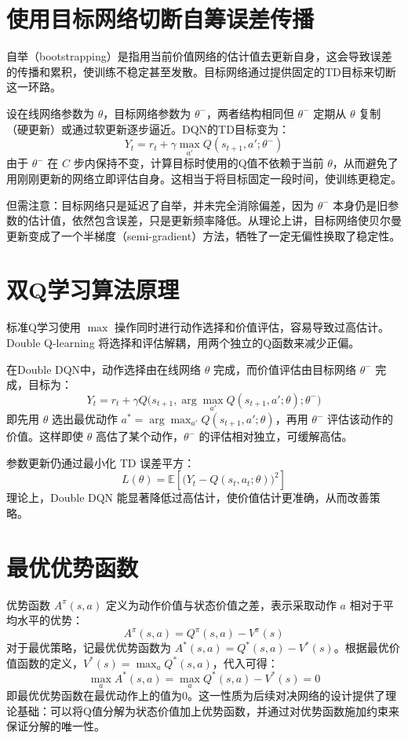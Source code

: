 \documentclass{article}
\begin{document}
\section{使用目标网络切断自筹误差传播}
自举（bootstrapping）是指用当前价值网络的估计值去更新自身，这会导致误差的传播和累积，使训练不稳定甚至发散。目标网络通过提供固定的TD目标来切断这一环路。

设在线网络参数为 $\theta$，目标网络参数为 $\theta^-$，两者结构相同但 $\theta^-$ 定期从 $\theta$ 复制（硬更新）或通过软更新逐步逼近。DQN的TD目标变为：
\[
Y_t = r_t + \gamma \max_{a'} Q(s_{t+1}, a'; \theta^-)
\tag{20}
\]
由于 $\theta^-$ 在 $C$ 步内保持不变，计算目标时使用的Q值不依赖于当前 $\theta$，从而避免了用刚刚更新的网络立即评估自身。这相当于将目标固定一段时间，使训练更稳定。

但需注意：目标网络只是延迟了自举，并未完全消除偏差，因为 $\theta^-$ 本身仍是旧参数的估计值，依然包含误差，只是更新频率降低。从理论上讲，目标网络使贝尔曼更新变成了一个半梯度（semi-gradient）方法，牺牲了一定无偏性换取了稳定性。

\section{双Q学习算法原理}
标准Q学习使用 $\max$ 操作同时进行动作选择和价值评估，容易导致过高估计。Double Q-learning 将选择和评估解耦，用两个独立的Q函数来减少正偏。

在Double DQN中，动作选择由在线网络 $\theta$ 完成，而价值评估由目标网络 $\theta^-$ 完成，目标为：
\[
Y_t = r_t + \gamma Q\big(s_{t+1}, \arg\max_{a'} Q(s_{t+1}, a'; \theta); \theta^- \big)
\tag{21}
\]
即先用 $\theta$ 选出最优动作 $a^* = \arg\max_{a'} Q(s_{t+1}, a'; \theta)$，再用 $\theta^-$ 评估该动作的价值。这样即使 $\theta$ 高估了某个动作，$\theta^-$ 的评估相对独立，可缓解高估。

参数更新仍通过最小化 TD 误差平方：
\[
L(\theta) = \mathbb{E}\left[ \big( Y_t - Q(s_t,a_t;\theta) \big)^2 \right]
\tag{22}
\]
理论上，Double DQN 能显著降低过高估计，使价值估计更准确，从而改善策略。

\section{最优优势函数}
优势函数 $A^\pi(s,a)$ 定义为动作价值与状态价值之差，表示采取动作 $a$ 相对于平均水平的优势：
\[
A^\pi(s,a) = Q^\pi(s,a) - V^\pi(s)
\tag{23}
\]
对于最优策略，记最优优势函数为 $A^*(s,a) = Q^*(s,a) - V^*(s)$。根据最优价值函数的定义，$V^*(s) = \max_a Q^*(s,a)$，代入可得：
\[
\max_a A^*(s,a) = \max_a Q^*(s,a) - V^*(s) = 0
\tag{24}
\]
即最优优势函数在最优动作上的值为0。这一性质为后续对决网络的设计提供了理论基础：可以将Q值分解为状态价值加上优势函数，并通过对优势函数施加约束来保证分解的唯一性。
\end{document}
